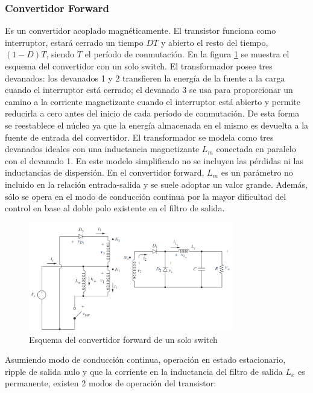 \subsubsection{Convertidor Forward}

Es un convertidor acoplado magnéticamente. El transistor funciona como interruptor, estará cerrado un tiempo $DT$ y abierto el resto del tiempo,
$(1 - D)T$, siendo $T$ el período de conmutación. 
En la figura \ref{fig:conversor_forward} se muestra el esquema del convertidor con un solo switch.
El transformador posee tres devanados: los devanados 1 y 2 transfieren la energía de la
fuente a la carga cuando el interruptor está cerrado; el devanado 3 se usa para proporcionar un
camino a la corriente magnetizante cuando el interruptor está abierto y permite reducirla a cero antes del
inicio de cada período de conmutación. De esta forma se reestablece el núcleo ya que la energía almacenada en el mismo es devuelta a la fuente de entrada del convertidor.
El transformador se modela como tres devanados ideales con una inductancia magnetizante $L_m$ conectada en paralelo con el devanado 1. 
En este modelo simplificado no se incluyen las pérdidas ni las inductancias de dispersión.
En el convertidor forward, $L_m$ es un parámetro no incluido en la relación entrada-salida y se suele adoptar un valor grande.
Además, sólo se opera en el modo de conducción continua por la mayor dificultad del control en base al doble polo existente en el filtro de salida. 

\begin{figure}[ht]
    \centering
    \includegraphics[width=0.8\textwidth]{../images/hart/conversor_forward.png}
    \caption{Esquema del convertidor forward de un solo switch}
    \label{fig:conversor_forward}
\end{figure}

Asumiendo modo de conducción continua, operación en estado estacionario, ripple de salida nulo 
y que la corriente en la inductancia del filtro de salida $L_x$ es permanente, existen 2 modos de operación del transistor:

